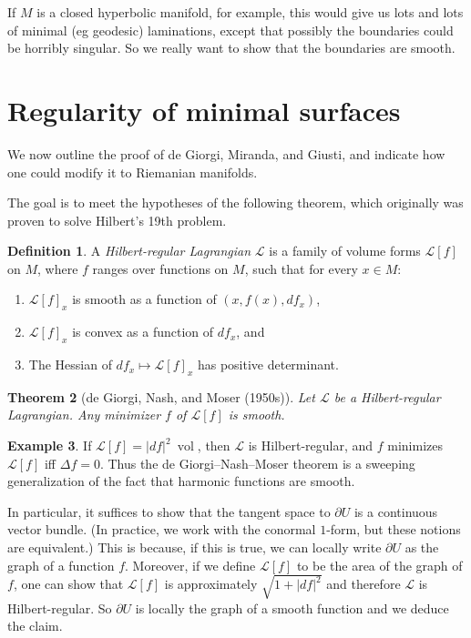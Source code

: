 \documentclass[reqno,12pt,letterpaper]{amsart}
\DeclareMathOperator{\vol}{vol}
\newcommand{\dfn}[1]{\emph{#1}\index{#1}}
\newtheorem{theorem}{Theorem}[section]
\theoremstyle{definition}
\newtheorem{definition}[theorem]{Definition}
\newtheorem{example}[theorem]{Example}
\begin{document}
If $M$ is a closed hyperbolic manifold, for example, this would give us lots and lots of minimal (eg geodesic) laminations, except that possibly the boundaries could be horribly singular.
So we really want to show that the boundaries are smooth.

\section{Regularity of minimal surfaces}
We now outline the proof of de Giorgi, Miranda, and Giusti, and indicate how one could modify it to Riemanian manifolds.

The goal is to meet the hypotheses of the following theorem, which originally was proven to solve Hilbert's 19th problem.

\begin{definition}
A \dfn{Hilbert-regular Lagrangian} $\mathscr L$ is a family of volume forms $\mathscr L[f]$ on $M$, where $f$ ranges over functions on $M$, such that for every $x \in M$:
\begin{enumerate}
\item $\mathscr L[f]_x$ is smooth as a function of $(x, f(x), df_x)$,
\item $\mathscr L[f]_x$ is convex as a function of $df_x$, and
\item The Hessian of $df_x \mapsto \mathscr L[f]_x$ has positive determinant.
\end{enumerate}
\end{definition}

\begin{theorem}[de Giorgi, Nash, and Moser (1950s)]
Let $\mathscr L$ be a Hilbert-regular Lagrangian.
Any minimizer $f$ of $\mathscr L[f]$ is smooth.
\end{theorem}

\begin{example}
If $\mathscr L[f] = |df|^2 ~\vol$, then $\mathscr L$ is Hilbert-regular, and $f$ minimizes $\mathscr L[f]$ iff $\Delta f = 0$.
Thus the de Giorgi--Nash--Moser theorem is a sweeping generalization of the fact that harmonic functions are smooth.
\end{example}

In particular, it suffices to show that the tangent space to $\partial U$ is a continuous vector bundle.
(In practice, we work with the conormal $1$-form, but these notions are equivalent.)
This is because, if this is true, we can locally write $\partial U$ as the graph of a function $f$.
Moreover, if we define $\mathscr L[f]$ to be the area of the graph of $f$, one can show that $\mathscr L[f]$ is approximately $\sqrt{1 + |df|^2}$ and therefore $\mathscr L$ is Hilbert-regular.
So $\partial U$ is locally the graph of a smooth function and we deduce the claim.
\end{document}
